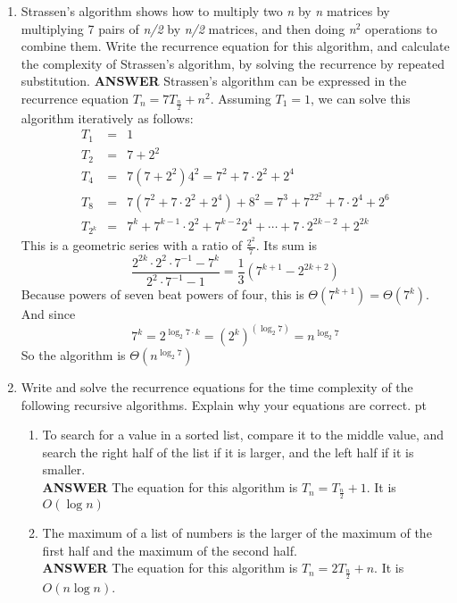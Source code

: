 \documentclass{article}
\begin{document}
\begin{enumerate}
\item Strassen's algorithm shows how to multiply two \textit{n} by
\textit{n} matrices by multiplying 7 pairs of \textit{n/2} by
\textit{n/2} matrices, and then doing \textit{n}$^{\mathit{2}}$
operations to combine them. Write the recurrence equation for this
algorithm, and calculate the complexity of Strassen's algorithm,
by solving the recurrence by repeated substitution. \vskip 10pt
\textbf{ANSWER} Strassen's algorithm can be expressed in the
recurrence equation $T_n = 7T_\frac{n}{2} + n^2$.  Assuming $T_1 =
1$, we can solve this algorithm iteratively as follows:
\begin{eqnarray*}
T_1 & = & 1 \\
T_2 & = & 7 + 2^2 \\
T_4 & = & 7(7 + 2^2) 4^2 = 7^2 + 7\cdot 2^2 +  2^4 \\
T_8 & = & 7 ( 7^2 + 7\cdot 2^2 + 2^4 ) + 8^2 =  7^3 + 7^22^2 +
7\cdot2^4 + 2^6 \\
T_{2^k}  & = & 7^k + 7^{k-1}\cdot 2^2 + 7^{k-2} 2^4 + \cdots +
7\cdot 2^{2k-2} + 2^{2k}
\end{eqnarray*}
This is a geometric series with a ratio of $\frac{2^2}{7}$. Its
sum is
\[
\frac{2^{2k}\cdot 2^2 \cdot 7^{-1} - 7^k}{2^2 \cdot 7^{-1} -1} =
\frac{1}{3}(7^{k+1} - 2^{2k+2} )
\]
Because powers of seven beat powers of four, this is $\Theta (
7^{k+1} ) = \Theta ( 7^k) $. And since
\[
7^k = 2^{\log_2 7 \cdot k} = (2^k)^{(\log_2 7)} = n^{\log_2 7}
\]
So the algorithm is $\Theta ( n^{\log_2 7} ) $
\item
 Write and solve the recurrence
equations for the time complexity of the following recursive
algorithms. Explain why your equations are correct.  pt
\begin{enumerate}
\item
 To search for a value in a sorted list, compare it to the
middle value, and search the right half of the list if it is
larger,
and the left half if it is smaller.\\
\vskip 10pt  \textbf{ANSWER}
The equation for this algorithm is $T_n = T_\frac{n}{2} + 1$. It is $O(\log n)$\\

\item The maximum of a list of numbers is the larger of the maximum
of the first half and the maximum of the second half.\\
\vskip 10pt  \textbf{ANSWER}
The equation for this algorithm is $T_n = 2T_\frac{n}{2} + n$. It is $O(n \log n)$. \\


\end{enumerate}
\end{enumerate}
\end{document}

